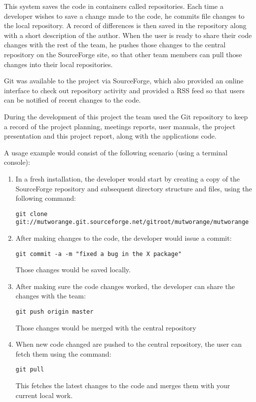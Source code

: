 This system saves the code in containers called repositories. Each time a
developer wishes to save a change made to the code, he commits file changes to
the local repository. A record of differences is then saved in the repository
along with a short description of the author. When the user is ready to share
their code changes with the rest of the team, he pushes those changes to the
central repository on the SourceForge site, so that other team members can pull
those changes into their local repositories.

Git was available to the project via SourceForge, which also provided an online
interface to check out repository activity and provided a RSS feed so that users
can be notified of recent changes to the code.

During the development of this project the team used the Git repository to keep
a record of the project planning, meetings reports, user manuals, the project
presentation and this project report, along with the applications code.

A usage example would consist of the following scenario (using a terminal
console):

\lstset{language=bash}
\begin{enumerate}
  \item In a fresh installation, the developer would start by creating a copy of
  the SourceForge repository and subsequent directory structure and files, using the following command:
  \begin{lstlisting}
git clone git://mutworange.git.sourceforge.net/gitroot/mutworange/mutworange
  \end{lstlisting}
  \item After making changes to the code, the developer would issue a commit:
  \begin{lstlisting}
git commit -a -m "fixed a bug in the X package"
  \end{lstlisting}
  Those changes would be saved locally.
  \item After making sure the code changes worked, the developer can share the
  changes with the team:
	\begin{lstlisting}
git push origin master
	\end{lstlisting}
Those changes would be merged with the central repository
  \item When new code changed are pushed to the central repository, the user can
  fetch them using the command:
	\begin{lstlisting}
git pull
	\end{lstlisting}
This fetches the latest changes to the code and merges them with your current
local work.
\end{enumerate}

